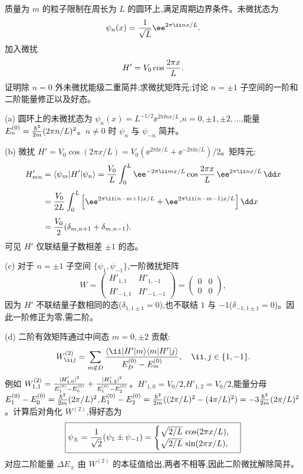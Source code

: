 \begin{question}
质量为 $m$ 的粒子限制在周长为 $L$ 的圆环上,满足周期边界条件。未微扰态为
\[
\psi_n(x)={1\over\sqrt L}\ee^{2\pi \ii n x/L}.
\]
加入微扰
\[
H'=V_0\cos{2\pi x\over L}.
\]
证明除 $n=0$ 外未微扰能级二重简并;求微扰矩阵元;讨论 $n=\pm1$ 子空间的一阶和二阶能量修正以及好态。
\end{question}
\begin{solution}
(a) 圆环上的未微扰态为 $\psi_n(x)=L^{-1/2}\ee^{2\pi \ii n x/L}$,$n=0,\pm1,\pm2,\dots$,能量 $E_n^{(0)}={\hbar^2\over2m}(2\pi n/L)^2$。$n\ne0$ 时 $\psi_n$ 与 $\psi_{-n}$ 简并。

(b) 微扰 $H'=V_0\cos(2\pi x/L)=V_0(\ee^{2\pi \ii x/L}+\ee^{-2\pi \ii x/L})/2$。矩阵元:
\[
\begin{aligned}
H'_{mn} &= \langle\psi_m|H'|\psi_n\rangle
= {V_0\over L}\int_0^L \ee^{-2\pi \ii mx/L}\cos{2\pi x\over L}\,\ee^{2\pi \ii nx/L}\,\dd x \\[4pt]
&= {V_0\over2L}\int_0^L \left[\ee^{2\pi \ii (n-m+1)x/L}+\ee^{2\pi \ii (n-m-1)x/L}\right]\dd x \\[4pt]
&= {V_0\over2}(\delta_{m,n+1}+\delta_{m,n-1}).
\end{aligned}
\]
可见 $H'$ 仅联结量子数相差 $\pm1$ 的态。

(c) 对于 $n=\pm1$ 子空间 $\{\psi_1,\psi_{-1}\}$,一阶微扰矩阵
\[
W = \begin{pmatrix}
H'_{1,1} & H'_{1,-1}\\
H'_{-1,1} & H'_{-1,-1}
\end{pmatrix}
= \begin{pmatrix}
0 & 0\\
0 & 0
\end{pmatrix},
\]
因为 $H'$ 不联结量子数相同的态($\delta_{1,1\pm1}=0$),也不联结 $1$ 与 $-1$($\delta_{-1,1\pm1}=0$)。因此一阶修正为零,需二阶。

(d) 二阶有效矩阵通过中间态 $m=0,\pm2$ 贡献:
\[
W^{(2)}_{\ii j} = \sum_{m\notin D} {\langle \ii|H'|m\rangle\langle m|H'|j\rangle\over E_D^{(0)}-E_m^{(0)}},\quad \ii,j\in\{1,-1\}.
\]
例如 $W^{(2)}_{1,1} = {|H'_{1,0}|^2\over E_1^{(0)}-E_0^{(0)}} + {|H'_{1,2}|^2\over E_1^{(0)}-E_2^{(0)}}$。$H'_{1,0}=V_0/2$,$H'_{1,2}=V_0/2$,能量分母 $E_1^{(0)}-E_0^{(0)}={\hbar^2\over2m}(2\pi/L)^2$,$E_1^{(0)}-E_2^{(0)}={\hbar^2\over2m}((2\pi/L)^2-(4\pi/L)^2)=-3{\hbar^2\over2m}(2\pi/L)^2$。计算后对角化 $W^{(2)}$,得好态为
\[
\boxed{\psi_\pm = {1\over\sqrt2}(\psi_1\pm\psi_{-1}) = \begin{cases}
\sqrt{2/L}\,\cos(2\pi x/L),\\
\sqrt{2/L}\,\sin(2\pi x/L),
\end{cases}}
\]
对应二阶能量 $\Delta E_\pm$ 由 $W^{(2)}$ 的本征值给出,两者不相等,因此二阶微扰解除简并。
\end{solution}

